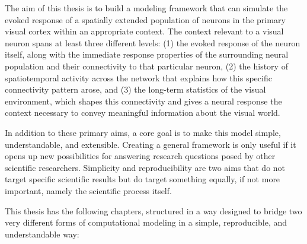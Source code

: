 \documentclass[phd,ianc,twoside]{infthesis}
\begin{document}
The aim of this thesis is to build a modeling framework that can
simulate the evoked response of a spatially extended population of
neurons in the primary visual cortex within an appropriate context. The
context relevant to a visual neuron spans at least three different
levels: (1) the evoked response of the neuron itself, along with the immediate
response properties of the surrounding neural population and their
connectivity to that particular neuron, (2) the history of spatiotemporal
activity across the network that explains how this specific connectivity
pattern arose, and (3) the long-term statistics of the visual environment,
which shapes this connectivity and gives a neural response the context
necessary to convey meaningful information about the visual world.

In addition to these primary aims, a core goal is to make this model
simple, understandable, and extensible. Creating a general framework is
only useful if it opens up new possibilities for answering research
questions posed by other scientific researchers. Simplicity and
reproducibility are two aims that do not target specific scientific
results but do target something equally, if not more important, namely
the scientific process itself.

This thesis has the following chapters, structured in a way designed
to bridge two very different forms of computational modeling in a
simple, reproducible, and understandable way:
\end{document}
